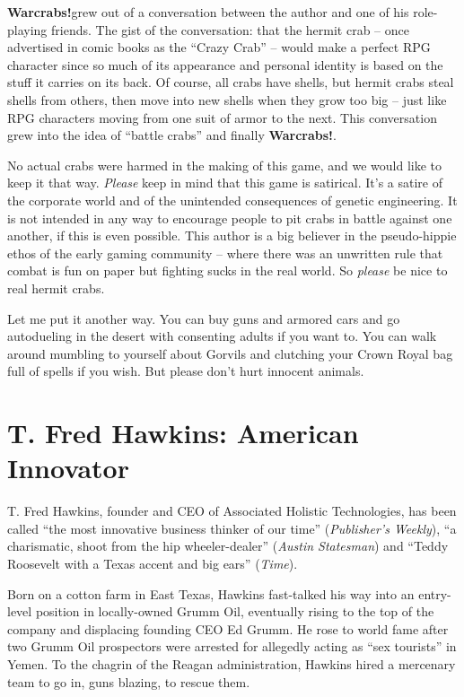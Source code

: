 \documentclass[a4paper,10pt]{article}
\newcommand{\warcrabs}{\textbf{Warcrabs!}}
\begin{document}
\warcrabs\hspace*{4pt}grew out of a conversation between the author and one of his role-playing friends. The gist of the conversation: that the hermit crab -- once advertised in comic books as the ``Crazy Crab'' -- would make a perfect RPG character since so much of its appearance and personal identity is based on the stuff it carries on its back. Of course, all crabs have shells, but hermit crabs steal shells from others, then move into new shells when they grow too big -- just like RPG characters moving from one suit of armor to the next. This conversation grew into the idea of ``battle crabs'' and finally \warcrabs.

No actual crabs were harmed in the making of this game, and we would like to keep it that way. \textit{Please} keep in mind that this game is satirical. It's a satire of the corporate world and of the unintended consequences of genetic engineering. It is not intended in any way to encourage people to pit crabs in battle against one another, if this is even possible. This author is a big believer in the pseudo-hippie ethos of the early gaming community -- where there was an unwritten rule that combat is fun on paper but fighting sucks in the real world. So \textit{please} be nice to real hermit crabs.

Let me put it another way. You can buy guns and armored cars and go autodueling in the desert with consenting adults if you want to. You can walk around mumbling to yourself about Gorvils and clutching your Crown Royal bag full of spells if you wish. But please don't hurt innocent animals.

\section*{T. Fred Hawkins: American Innovator}
\label{sec:TFredHawkins}

T. Fred Hawkins, founder and CEO of Associated Holistic Technologies, has been called ``the most innovative business thinker of our time'' (\textit{Publisher's Weekly}), ``a charismatic, shoot from the hip wheeler-dealer'' (\textit{Austin Statesman}) and ``Teddy Roosevelt with a Texas accent and big ears'' (\textit{Time}).

Born on a cotton farm in East Texas, Hawkins fast-talked his way into an entry-level position in locally-owned Grumm Oil, eventually rising to the top of the company and displacing founding CEO Ed Grumm. He rose to world fame after two Grumm Oil prospectors were arrested for allegedly acting as ``sex tourists'' in Yemen. To the chagrin of the Reagan administration, Hawkins hired a mercenary team to go in, guns blazing, to rescue them.
\end{document}
